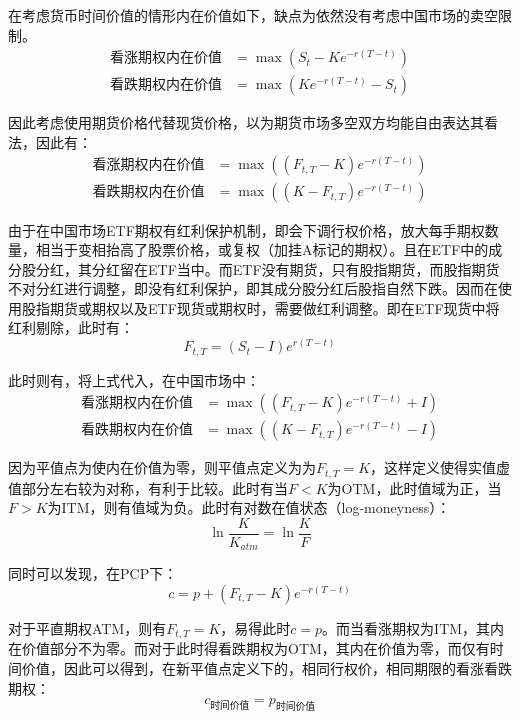 \documentclass[11pt]{article}
\begin{document}
在考虑货币时间价值的情形内在价值如下，缺点为依然没有考虑中国市场的卖空限制。
\begin{align*}
    \text{看涨期权内在价值} & = \max(S_t-Ke^{-r(T-t)}) \\
    \text{看跌期权内在价值} & = \max(Ke^{-r(T-t)}-S_t)
\end{align*}

因此考虑使用期货价格代替现货价格，以为期货市场多空双方均能自由表达其看法，因此有：
\begin{align*}
    \text{看涨期权内在价值} & = \max((F_{t,T}-K)e^{-r(T-t)}) \\
    \text{看跌期权内在价值} & = \max((K-F_{t,T})e^{-r(T-t)})
\end{align*}

由于在中国市场ETF期权有红利保护机制，即会下调行权价格，放大每手期权数量，相当于变相抬高了股票价格，或复权（加挂A标记的期权）。且在ETF中的成分股分红，其分红留在ETF当中。而ETF没有期货，只有股指期货，而股指期货不对分红进行调整，即没有红利保护，即其成分股分红后股指自然下跌。因而在使用股指期货或期权以及ETF现货或期权时，需要做红利调整。即在ETF现货中将红利剔除，此时有：
\begin{equation*}
    F_{t,T} = (S_t-I)e^{r(T-t)}
\end{equation*}

此时则有，将上式代入，在中国市场中：
\begin{align*}
    \text{看涨期权内在价值} & = \max((F_{t,T}-K)e^{-r(T-t)}+I) \\
    \text{看跌期权内在价值} & = \max((K-F_{t,T})e^{-r(T-t)}-I)
\end{align*}

因为平值点为使内在价值为零，则平值点定义为为$F_{t,T}=K$，这样定义使得实值虚值部分左右较为对称，有利于比较。此时有当$F<K$为OTM，此时值域为正，当$F>K$为ITM，则有值域为负。此时有对数在值状态（log-moneyness）：
\begin{equation*}
    \ln{\frac{K}{K_{atm}}} = \ln{\frac{K}{F}}
\end{equation*}

同时可以发现，在PCP下：
\begin{equation*}
    c = p + (F_{t,T}-K) e^{-r(T-t)}
\end{equation*}

对于平直期权ATM，则有$F_{t,T}=K$，易得此时$c=p$。而当看涨期权为ITM，其内在价值部分不为零。而对于此时得看跌期权为OTM，其内在价值为零，而仅有时间价值，因此可以得到，在新平值点定义下的，相同行权价，相同期限的看涨看跌期权：
\begin{equation*}
    c_{\text{时间价值}} = p_{\text{时间价值}}
\end{equation*}
\end{document}
